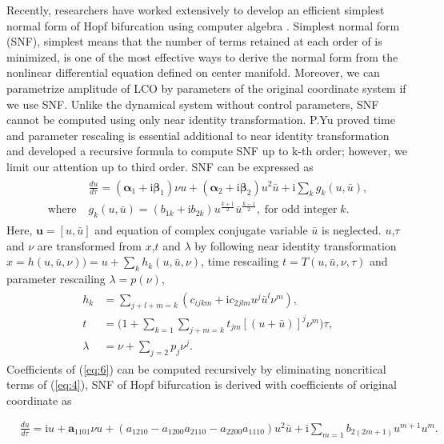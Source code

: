 \documentclass[openacc]{rsproca_new}%
\def\vec#1{\ensuremath{\mathbf{#1}}}
\newcommand{\Eref}[1]{(\ref{#1})}
\begin{document}
Recently, researchers have worked extensively to develop an efficient simplest normal form of Hopf bifurcation using computer algebra \cite{algaba1998hypernormal,yu1998computation}. Simplest normal form (SNF), simplest means that the number of terms retained at each order of is minimized, is one of the most effective ways to derive the normal form from the nonlinear differential equation defined on center manifold. Moreover, we can parametrize amplitude of LCO by parameters of the original coordinate system if we use SNF. Unlike the dynamical system without control parameters, SNF cannot be computed using only near identity transformation. P.Yu \cite{yu2002simplest} proved time and parameter rescaling is essential additional to near identity transformation and developed a recursive formula to compute SNF up to k-th order; however, we limit our attention up to third order. SNF can be expressed as
\begin{align}\label{eq:5}
  \begin{split}
    &\frac{du}{d\tau}=(\vec{\alpha}_1+\textrm{i}\vec{\beta}_1)\nu u+(\vec{\alpha}_2+\textrm{i}\vec{\beta}_2) u^2 \bar{u}+\textrm{i}\sum_k g_k(u,\bar{u}),\\
    \textrm{where} \;  &g_k(u,\bar{u})=(b_{1k}+\textrm{i}b_{2k})u^{\frac{k+1}{2}}\bar{u}^{\frac{k-1}{2}}, \; \textrm{for odd integer} \;k.
  \end{split}
\end{align}
Here, \(\vec{u}=[u,\bar{u}]\) and equation of complex conjugate variable \(\bar{u}\) is neglected. \(u\),\(\tau\) and \(\nu\) are transformed from \(x\),\(t\) and \(\lambda\) by following near identity transformation
\(x=h(u,\bar{u},\nu))=u+\sum_k h_k(u,\bar{u},\nu)\), time rescailing \(t=T(u,\bar{u},\nu,\tau)\) and parameter rescailing \(\lambda=p(\nu)\),
\begin{align}\label{eq:6}
  \begin{split}
    h_k &=\sum_{j+l+m=k}(c_{ijkm}+\textrm{i}c_{2jlm}u^j\bar{u}^l \nu^m),\\
    t &=\Big(1+\sum_{k=1}\sum_{j+m=k}t_{jm}[(u+\bar{u})]^j\nu^m\Big)\tau,\\
    \lambda &=\nu+\sum_{j=2}p_j \nu^j.
  \end{split}
\end{align}
Coefficients of \Eref{eq:6} can be computed recursively \cite{yu2002simplest} by eliminating noncritical terms of \Eref{eq:4}, SNF of Hopf bifurcation is derived with coefficients of original coordinate as

\begin{align}\label{eq:9}
&\frac{du}{d\tau}=\textrm{i}u+\vec{a}_{1101}\nu u+(a_{1210}-a_{1200}a_{2110}-a_{2200}a_{1110})u^2\bar u+\textrm{i}\sum_{m=1}b_{2(2m+1)}u^{m+1}u^m.
\end{align}
\end{document}
